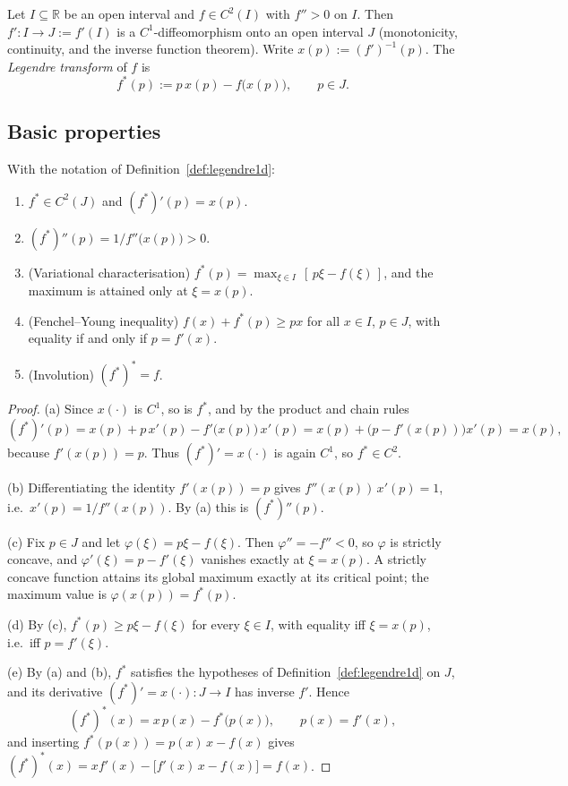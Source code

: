 \begin{definition}\label{def:legendre1d}
Let $I\subseteq\mathbb{R}$ be an open interval and $f\in C^2(I)$ with $f''>0$ on
$I$.  Then $f'\colon I\to J:=f'(I)$ is a $C^1$-diffeomorphism onto an open
interval $J$ (monotonicity, continuity, and the inverse function theorem).
Write $x(p):=(f')^{-1}(p)$. The \emph{Legendre transform} of $f$ is
\[
  f^*(p) := p\,x(p)-f\bigl(x(p)\bigr),\qquad p\in J .
\]
\end{definition}

\subsection{Basic properties}

\begin{proposition}\label{prop:basic1d}
With the notation of Definition~\ref{def:legendre1d}:
\begin{enumerate}[label=(\alph*),nosep]
  \item $f^*\in C^2(J)$ and $(f^*)'(p)=x(p)$.
  \item $(f^*)''(p)=1/f''\bigl(x(p)\bigr)>0$.
  \item (Variational characterisation) $f^*(p)=\max_{\xi\in I}\,[\,p\xi-f(\xi)\,]$,
        and the maximum is attained only at $\xi=x(p)$.
  \item (Fenchel--Young inequality) $f(x)+f^*(p)\ge px$ for all $x\in I$,
        $p\in J$, with equality if and only if $p=f'(x)$.
  \item (Involution) $(f^*)^*=f$.
\end{enumerate}
\end{proposition}

\begin{proof}
(a) Since $x(\cdot)$ is $C^1$, so is $f^*$, and by the product and chain rules
\[
  (f^*)'(p)=x(p)+p\,x'(p)-f'\bigl(x(p)\bigr)\,x'(p)
          =x(p)+\bigl(p-f'(x(p))\bigr)x'(p)=x(p),
\]
because $f'(x(p))=p$.  Thus $(f^*)'=x(\cdot)$ is again $C^1$, so
$f^*\in C^2$.

(b) Differentiating the identity $f'(x(p))=p$ gives
$f''(x(p))\,x'(p)=1$, i.e.\ $x'(p)=1/f''(x(p))$.  By (a) this is
$(f^*)''(p)$.

(c) Fix $p\in J$ and let $\varphi(\xi)=p\xi-f(\xi)$.  Then
$\varphi''=-f''<0$, so $\varphi$ is strictly concave, and
$\varphi'(\xi)=p-f'(\xi)$ vanishes exactly at $\xi=x(p)$.  A strictly
concave function attains its global maximum exactly at its critical point;
the maximum value is $\varphi(x(p))=f^*(p)$.

(d) By (c), $f^*(p)\ge p\xi-f(\xi)$ for every $\xi\in I$, with equality iff
$\xi=x(p)$, i.e.\ iff $p=f'(\xi)$.

(e) By (a) and (b), $f^*$ satisfies the hypotheses of
Definition~\ref{def:legendre1d} on $J$, and its derivative
$(f^*)'=x(\cdot)\colon J\to I$ has inverse $f'$.  Hence
\[
  (f^*)^*(x)=x\,p(x)-f^*\bigl(p(x)\bigr),\qquad p(x)=f'(x),
\]
and inserting $f^*(p(x))=p(x)\,x-f(x)$ gives
$(f^*)^*(x)=x f'(x)-\bigl[f'(x)\,x-f(x)\bigr]=f(x)$.
\end{proof}

